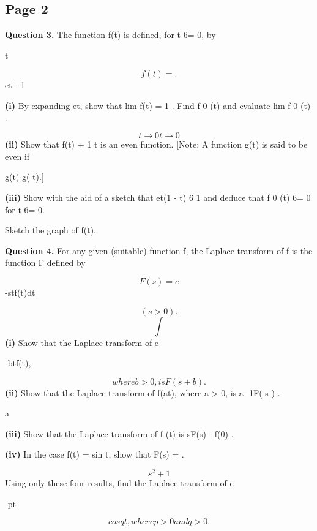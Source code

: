 \documentclass[12pt]{article}
\begin{document}
\subsection*{Page 2}
\begin{flushleft}
\bigskip\textbf{Question 3.} The function f(t) is defined, for t 6= 0, by\par
t\par
\[f(t) = .\]
et - 1\par
\textbf{(i)} By expanding et, show that lim f(t) = 1 . Find f 0 (t) and evaluate lim f 0 (t) .\par
\[t\to0 t\to0\]
\textbf{(ii)} Show that f(t) + 1 t is an even function. [Note: A function g(t) is said to be even if\par
g(t) \equiv g(-t).]\par
\textbf{(iii)} Show with the aid of a sketch that et(1 - t) 6 1 and deduce that f 0 (t) 6= 0 for t 6= 0.\par
Sketch the graph of f(t).\par
\bigskip\textbf{Question 4.} For any given (suitable) function f, the Laplace transform of f is the function F defined by\par
\infty\par
\[F(s) = e\]
-stf(t)dt\par
\[(s > 0) .\]
\[\int\]
\textbf{(i)} Show that the Laplace transform of e\par
-btf(t),\par
\[where b > 0, is F(s + b).\]
\textbf{(ii)} Show that the Laplace transform of f(at), where a > 0, is a -1F( s ) .\par
a\par
\textbf{(iii)} Show that the Laplace transform of f (t) is sF(s) - f(0) .\par
\textbf{(iv)} In the case f(t) = sin t, show that F(s) = .\par
\[s^2 + 1\]
Using only these four results, find the Laplace transform of e\par
-pt\par
\[cos qt , where p > 0 and q > 0.\]
\end{flushleft}
\end{document}

